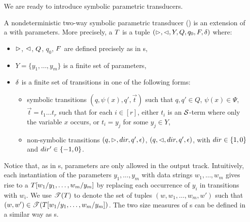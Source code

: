 
We are ready to introduce symbolic parametric transducers.

\begin{definition}
A nondeterministic two-way symbolic parametric transducer (\SSPT) is an extension of a \SST{} with parameters. More precisely,  a \SSPT{} $T$ is a tuple
$(\vartriangleright, \vartriangleleft, Y, Q, q_0, F, \delta)$ where:
\begin{itemize}
%
\item $\vartriangleright$, $\vartriangleleft$, $Q$, $q_0$, $F$ are defined precisely as in \SST{}s, 
%
\item $Y=\{y_1,\ldots, y_m\}$ is a finite set of parameters, 
%
\item $\delta$ is a finite set of transitions in one of the following forms: 
\begin{itemize}
\item symbolic transitions $(q, \psi(x), q', \vec{t})$ such that $q,q' \in Q$, $\psi(x) \in \Psi$,
$\vec{t} = t_1 \ldots t_r$ such that for each $i \in [r]$, either $t_i$ is an $\mathcal{S}$-term where only the variable $x$ occurs, or $t_i = y_j$ for some $y_j \in Y$,
%
\item non-symbolic transitions $(q, \vartriangleright, dir, q', \epsilon)$, $(q, \vartriangleleft, dir, q', \epsilon)$, with $dir \in \{1, 0\}$ and $dir' \in \{-1, 0\}$. 
\end{itemize}
\end{itemize}
\end{definition}

Notice that, as in \PPT{}s, parameters are only allowed in the output track.
Intuitively, each instantiation of the parameters $y_1,\ldots, y_m$ with data strings 
$w_1,\ldots, w_m$ gives rise to a \SST{} $T[w_1/y_1,\ldots, w_m/y_m]$ by replacing each occurrence of $y_i$ in transitions with $w_i$. 
%
We use $\mathscr{T}(T)$ to denote the set of tuples $(w, w_1, \ldots, w_m, w')$ such that $(w, w') \in \mathscr{T}(T[w_1/y_1,\ldots, w_m/y_m])$.
The two size measures of \SSPT{}s can be defined in a similar way as \SST{}s. 


